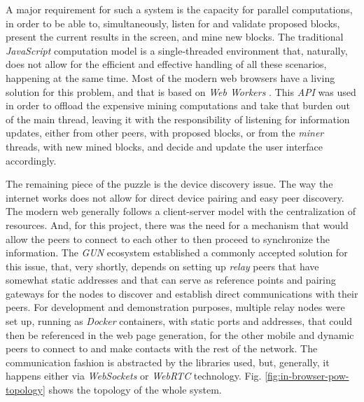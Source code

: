 \documentclass[journal]{IEEEtran}
\begin{document}
A major requirement for such a system is the capacity for parallel computations, 
in order to be able to, simultaneously, listen for and validate proposed blocks, 
present the current results in the screen, and mine new blocks. The traditional 
\emph{JavaScript} computation model is a single-threaded environment that, naturally,
does not allow for the efficient and effective handling of all these scenarios, happening
at the same time. Most of the modern web browsers have a living solution for this problem, 
and that is based on \emph{Web Workers} \cite{webworkers}. This \emph{API} was used in order to offload
the expensive mining computations and take that burden out of the main thread, leaving it
with the responsibility of listening for information updates, either from other peers, with
proposed blocks, or from the \emph{miner} threads, with new mined blocks, and decide and update
the user interface accordingly.

The remaining piece of the puzzle is the device discovery issue. The way the internet works does not
allow for direct device pairing and easy peer discovery. The modern web generally follows a 
client-server model with the centralization of resources. And, for this project, there was the need
for a mechanism that would allow the peers to connect to each other to then proceed to synchronize
the information. The \emph{GUN} ecosystem established a commonly accepted solution for this issue, that, 
very shortly, depends on setting up \emph{relay} peers that have somewhat static addresses and that can 
serve as reference points and pairing gateways for the nodes to discover and establish direct communications 
with their peers. For development and demonstration purposes, multiple relay nodes were set up, running 
as \emph{Docker} containers, with static ports and addresses, that could then be referenced in the web 
page generation, for the other mobile and dynamic peers to connect to and make contacts with the rest of the network.
The communication fashion is abstracted by the libraries used, but, generally, it happens either via \emph{WebSockets}
or \emph{WebRTC} technology. Fig. \ref{fig:in-browser-pow-topology} shows the topology of the whole system.
\end{document}
